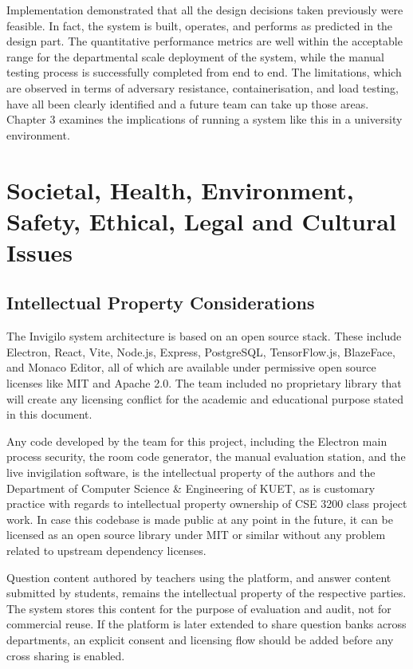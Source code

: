 \documentclass[12pt, a4paper]{report}
\begin{document}
\begin{justify}
  {\fontsize{12}{18}\selectfont
    Implementation demonstrated that all the design decisions taken previously were feasible. In fact, the system is built, operates, and performs as predicted in the design part. The quantitative performance metrics are well within the acceptable range for the departmental scale deployment of the system, while the manual testing process is successfully completed from end to end. The limitations, which are observed in terms of adversary resistance, containerisation, and load testing, have all been clearly identified and a future team can take up those areas. Chapter 3 examines the implications of running a system like this in a university environment.
  }
\end{justify}

\chapter{Societal, Health, Environment, Safety, Ethical, Legal and Cultural Issues}

\section{Intellectual Property Considerations}

\begin{justify}
  {\fontsize{12}{18}\selectfont
    The Invigilo system architecture is based on an open source stack. These include Electron, React, Vite, Node.js, Express, PostgreSQL, TensorFlow.js, BlazeFace, and Monaco Editor, all of which are available under permissive open source licenses like MIT and Apache 2.0. The team included no proprietary library that will create any licensing conflict for the academic and educational purpose stated in this document.

    Any code developed by the team for this project, including the Electron main process security, the room code generator, the manual evaluation station, and the live invigilation software, is the intellectual property of the authors and the Department of Computer Science \& Engineering of KUET, as is customary practice with regards to intellectual property ownership of CSE 3200 class project work. In case this codebase is made public at any point in the future, it can be licensed as an open source library under MIT or similar without any problem related to upstream dependency licenses.

    Question content authored by teachers using the platform, and answer content submitted by students, remains the intellectual property of the respective parties. The system stores this content for the purpose of evaluation and audit, not for commercial reuse. If the platform is later extended to share question banks across departments, an explicit consent and licensing flow should be added before any cross sharing is enabled.
  }
\end{justify}
\end{document}
